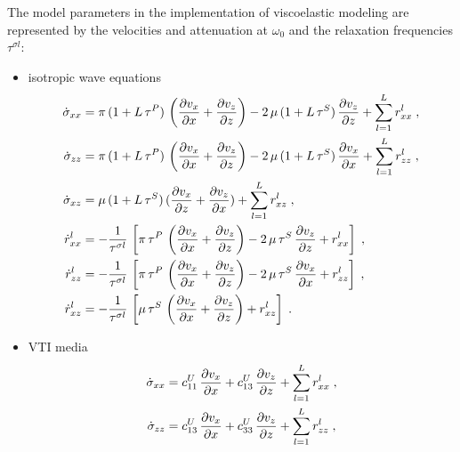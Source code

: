 The model parameters in the implementation of viscoelastic modeling are represented by the velocities and attenuation at $\omega_0$ and the relaxation frequencies $\tau^{\sigma l}$:
\begin{itemize}
    \item isotropic wave equations
        \begin{subequations}
        \allowdisplaybreaks
        \begin{align}
            \dot{\sigma}_{xx} &= \pi\,(1+L\,\tau^P)\,\left(\frac{\partial v_x}{\partial x} + \frac{\partial v_z}{\partial z} \right) - 2\,\mu\,(1+L\,\tau^S)\,\frac{\partial v_z}{\partial z} + \sum_{l=1}^{L}r_{xx}^l\;,\\   
            \dot{\sigma}_{zz} &= \pi\,(1+L\,\tau^P)\,\left(\frac{\partial v_x}{\partial x} + \frac{\partial v_z}{\partial z} \right) - 2\,\mu\,(1+L\,\tau^S)\,\frac{\partial v_x}{\partial x} + \sum_{l=1}^{L}r_{zz}^l\;,\\   
            \dot{\sigma}_{xz} &= \mu\,(1+L\,\tau^S)\,(\frac{\partial v_x}{\partial z}+\frac{\partial v_z}{\partial x})+\sum_{l=1}^{L}r_{xz}^l\;,\\    
            \dot{r}_{xx}^l &= -\frac{1}{\tau^{\sigma l}}\, \left[\pi\,\tau^P\,\left(\frac{\partial v_x}{\partial x} + \frac{\partial v_z}{\partial z} \right) - 2\,\mu\,\tau^S\,\frac{\partial v_z}{\partial z} + r_{xx}^l \right]\;,\\ 
            \dot{r}_{zz}^l &= -\frac{1}{\tau^{\sigma l}}\, \left[\pi\,\tau^P\,\left(\frac{\partial v_x}{\partial x} + \frac{\partial v_z}{\partial z} \right) - 2\,\mu\,\tau^S\,\frac{\partial v_x}{\partial x} + r_{zz}^l \right]\;,\\ 
            \dot{r}_{xz}^l &= -\frac{1}{\tau^{\sigma l}}\, \left[\mu\,\tau^S\,\left(\frac{\partial v_x}{\partial x} + \frac{\partial v_z}{\partial z} \right) + r_{xz}^l \right]\;.
        \end{align}
        \end{subequations}
    \item VTI media
        \begin{subequations}
        \allowdisplaybreaks
        \begin{align}
            \dot{\sigma}_{xx} &= c_{11}^U\,\frac{\partial v_x}{\partial x}+c_{13}^U\,\frac{\partial v_z}{\partial z}+\sum_{l=1}^{L}r_{xx}^l\;,\\   
            \dot{\sigma}_{zz} &= c_{13}^U\,\frac{\partial v_x}{\partial x}+c_{33}^U\,\frac{\partial v_z}{\partial z}+\sum_{l=1}^{L}r_{zz}^l\;,\\   

\end{align}
\end{subequations}
\end{itemize}
